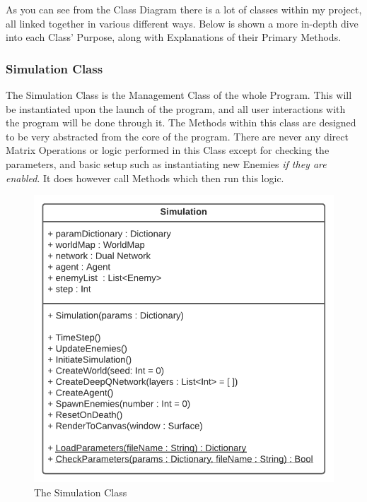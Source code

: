 \begin{flushleft}
            As you can see from the Class Diagram there is a lot of classes within my project, all linked together in various different ways. 
            Below is shown a more in-depth dive into each Class' Purpose, along with Explanations of their Primary Methods.\\
            \subsubsection{Simulation Class}
                The Simulation Class is the Management Class of the whole Program. This will be instantiated upon the launch of the program, and all user
                interactions with the program will be done through it. The Methods within this class are designed to be very abstracted from the core
                of the program. There are never any direct Matrix Operations or logic performed in this Class except for checking the parameters, and
                basic setup such as instantiating new Enemies \textit{if they are enabled}. It does however call Methods which then run this logic.

                \begin{figure}[H]
                    \centering
                    \includegraphics[width=.6\textwidth]{Images/Design/Classes/Simulation.png} 
                    \caption*{The Simulation Class}
                \end{figure}

\end{flushleft}
